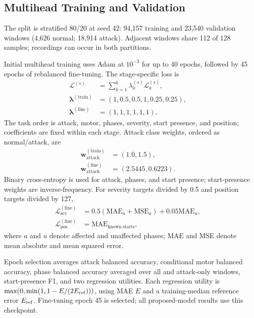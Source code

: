 \documentclass[conference,letterpaper]{IEEEtran}
\begin{document}
\subsection{Multihead Training and Validation}
The split is stratified 80/20 at seed 42: 94,157 training and 23,540 validation windows (4,626 normal; 18,914 attack). Adjacent windows share 112 of 128 samples; recordings can occur in both partitions.

Initial multihead training uses Adam at $10^{-3}$ for up to 40 epochs, followed by 45 epochs of rebalanced fine-tuning. The stage-specific loss is
\begin{equation}
\begin{aligned}
\mathcal{L}^{(s)} &= \sum_{k=1}^{6}\lambda_k^{(s)}\mathcal{L}_k^{(s)},\\
\boldsymbol{\lambda}^{(\mathrm{train})} &= (1,0.5,0.5,1,0.25,0.25),\\
\boldsymbol{\lambda}^{(\mathrm{fine})} &= (1,1,1,1,1,1).
\end{aligned}
\label{eq:multitask_loss}
\end{equation}
The task order is attack, motor, phases, severity, start presence, and position; coefficients are fixed within each stage. Attack class weights, ordered as normal/attack, are
\begin{equation}
\begin{aligned}
\mathbf{w}_{\mathrm{attack}}^{(\mathrm{train})} &= (1.0,1.5),\\
\mathbf{w}_{\mathrm{attack}}^{(\mathrm{fine})} &= (2.5445,0.6223).
\end{aligned}
\label{eq:attack_weights}
\end{equation}
Binary cross-entropy is used for attack, phases, and start presence; start-presence weights are inverse-frequency. For severity targets divided by 0.5 and position targets divided by 127,
\begin{equation}
\begin{aligned}
\mathcal{L}_{\mathrm{sev}}^{(\mathrm{fine})} &= 0.5(\mathrm{MAE}_{a}+\mathrm{MSE}_{a})+0.05\mathrm{MAE}_{u},\\
\mathcal{L}_{\mathrm{pos}}^{(\mathrm{fine})} &= \mathrm{MAE}_{\mathrm{known\ starts}},
\end{aligned}
\end{equation}
where $a$ and $u$ denote affected and unaffected phases; MAE and MSE denote mean absolute and mean squared error.

Epoch selection averages attack balanced accuracy, conditional motor balanced accuracy, phase balanced accuracy averaged over all and attack-only windows, start-presence F1, and two regression utilities. Each regression utility is $\max(0,\min(1,1-E/(2E_{\rm ref})))$, using MAE $E$ and a training-median reference error $E_{\rm ref}$. Fine-tuning epoch 45 is selected; all proposed-model results use this checkpoint.
\end{document}

